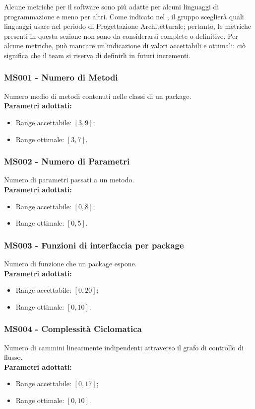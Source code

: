 Alcune metriche per il software sono più adatte per alcuni linguaggi di programmazione e meno per altri. Come indicato nel \PdP , il gruppo \gruppo \space sceglierà quali linguaggi usare nel periodo di Progettazione Architetturale; pertanto, le metriche presenti in questa sezione non sono da considerarsi complete o definitive.\newline
Per alcune metriche, può mancare un'indicazione di valori accettabili e ottimali: ciò significa che il team si riserva di definirli in futuri incrementi.

\subsubsection{MS001 - Numero di Metodi}\mbox{}
Numero medio di metodi contenuti nelle classi di un package. \\[0,2cm]
\textbf{Parametri adottati:}
\begin{itemize}
	\item Range accettabile: $[3,9]$;
	\item Range ottimale: $[3,7]$.
\end{itemize}

\subsubsection{MS002 - Numero di Parametri}\mbox{}
Numero di parametri passati a un metodo. \\[0,2cm]
\textbf{Parametri adottati:}
\begin{itemize}
	\item Range accettabile: $[0,8]$;
	\item Range ottimale: $[0,5]$.
\end{itemize}

\subsubsection{MS003 - Funzioni di interfaccia per package}\mbox{}
Numero di funzione che un package espone. \\[0,2cm]
\textbf{Parametri adottati:}
\begin{itemize}
	\item Range accettabile: $[0,20]$;
	\item Range ottimale: $[0,10]$.
\end{itemize}

\subsubsection{MS004 - Complessità Ciclomatica}\mbox{}
Numero di cammini linearmente indipendenti attraverso il grafo di controllo di flusso. \\[0,2cm]
\textbf{Parametri adottati:}
\begin{itemize}
	\item Range accettabile: $[0,17]$;
	\item Range ottimale: $[0,10]$.
\end{itemize}

